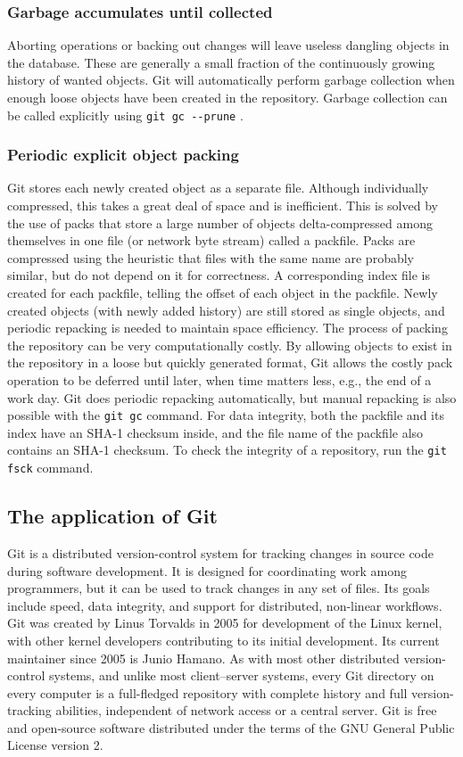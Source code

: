 \documentclass[a4paper]{report}
\begin{document}
\subsubsection{Garbage accumulates until collected}
Aborting operations or backing out changes will leave useless dangling objects in the database. These are generally a small fraction of the continuously growing history of wanted objects. Git will automatically perform garbage collection when enough loose objects have been created in the repository. Garbage collection can be called explicitly using \lstinline !git gc --prune! .
\subsubsection{Periodic explicit object packing}
Git stores each newly created object as a separate file. Although individually compressed, this takes a great deal of space and is inefficient. This is solved by the use of packs that store a large number of objects delta-compressed among themselves in one file (or network byte stream) called a packfile. Packs are compressed using the heuristic that files with the same name are probably similar, but do not depend on it for correctness. A corresponding index file is created for each packfile, telling the offset of each object in the packfile. Newly created objects (with newly added history) are still stored as single objects, and periodic repacking is needed to maintain space efficiency. The process of packing the repository can be very computationally costly. By allowing objects to exist in the repository in a loose but quickly generated format, Git allows the costly pack operation to be deferred until later, when time matters less, e.g., the end of a work day. Git does periodic repacking automatically, but manual repacking is also possible with the \lstinline !git gc! command. For data integrity, both the packfile and its index have an SHA-1 checksum inside, and the file name of the packfile also contains an SHA-1 checksum. To check the integrity of a repository, run the \lstinline!git fsck! command.
\subsection{The application of Git}

Git is a distributed version-control system for tracking changes in source code during software development. It is designed for coordinating work among programmers, but it can be used to track changes in any set of files. Its goals include speed, data integrity, and support for distributed, non-linear workflows.
Git was created by Linus Torvalds in 2005 for development of the Linux kernel, with other kernel developers contributing to its initial development. Its current maintainer since 2005 is Junio Hamano.
As with most other distributed version-control systems, and unlike most client–server systems, every Git directory on every computer is a full-fledged repository with complete history and full version-tracking abilities, independent of network access or a central server.
Git is free and open-source software distributed under the terms of the GNU General Public License version 2.
\end{document}
